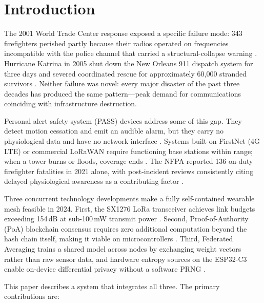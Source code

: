 \documentclass[journal]{IEEEtran}
\begin{document}
\section{Introduction}
\label{sec:intro}

The 2001 World Trade Center response exposed a specific failure mode: 343
firefighters perished partly because their radios operated on frequencies
incompatible with the police channel that carried a structural-collapse
warning \cite{NIST_9_11_comms}. Hurricane Katrina in 2005 shut down the
New Orleans 911 dispatch system for three days and severed coordinated
rescue for approximately 60,000 stranded survivors
\cite{AFCEA_Katrina_comms}. Neither failure was novel: every major
disaster of the past three decades has produced the same pattern---peak
demand for communications coinciding with infrastructure destruction.

Personal alert safety system (PASS) devices address some of this gap.
They detect motion cessation and emit an audible alarm, but they carry no
physiological data and have no network interface
\cite{IEEE_PST_wearables}. Systems built on FirstNet (4G LTE) or
commercial LoRaWAN require functioning base stations within range; when a
tower burns or floods, coverage ends \cite{Preprints_FirstNet_5G_review}.
The NFPA reported 136 on-duty firefighter fatalities in 2021 alone, with
post-incident reviews consistently citing delayed physiological awareness
as a contributing factor \cite{NFPA_2021_firefighter}.

Three concurrent technology developments make a fully self-contained
wearable mesh feasible in 2024. First, the SX1276 LoRa transceiver
achieves link budgets exceeding 154\,dB at sub-100\,mW transmit power
\cite{Semtech2019}. Second, Proof-of-Authority (PoA) blockchain consensus
requires zero additional computation beyond the hash chain itself,
making it viable on microcontrollers \cite{Puthal2018}. Third, Federated
Averaging \cite{McMahan2017} trains a shared model across nodes by
exchanging weight vectors rather than raw sensor data, and hardware
entropy sources on the ESP32-C3 enable on-device differential privacy
without a software PRNG \cite{Abadi2016}.

This paper describes a system that integrates all three. The primary
contributions are:
\end{document}
